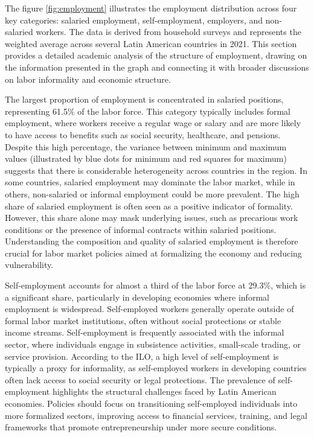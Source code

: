 \documentclass[english]{article}
\begin{document}
\begin{enumerate}
The figure \ref{fig:employment} illustrates the employment distribution across four key categories: salaried employment, self-employment, employers, and non-salaried workers. The data is derived from household surveys and represents the weighted average across several Latin American countries in 2021. This section provides a detailed academic analysis of the structure of employment, drawing on the information presented in the graph and connecting it with broader discussions on labor informality and economic structure.

The largest proportion of employment is concentrated in salaried positions, representing 61.5\% of the labor force. This category typically includes formal employment, where workers receive a regular wage or salary and are more likely to have access to benefits such as social security, healthcare, and pensions. Despite this high percentage, the variance between minimum and maximum values (illustrated by blue dots for minimum and red squares for maximum) suggests that there is considerable heterogeneity across countries in the region. In some countries, salaried employment may dominate the labor market, while in others, non-salaried or informal employment could be more prevalent. The high share of salaried employment is often seen as a positive indicator of formality. However, this share alone may mask underlying issues, such as precarious work conditions or the presence of informal contracts within salaried positions. Understanding the composition and quality of salaried employment is therefore crucial for labor market policies aimed at formalizing the economy and reducing vulnerability.

Self-employment accounts for almost a third of the labor force at 29.3\%, which is a significant share, particularly in developing economies where informal employment is widespread. Self-employed workers generally operate outside of formal labor market institutions, often without social protections or stable income streams.
Self-employment is frequently associated with the informal sector, where individuals engage in subsistence activities, small-scale trading, or service provision. According to the ILO, a high level of self-employment is typically a proxy for informality, as self-employed workers in developing countries often lack access to social security or legal protections. The prevalence of self-employment highlights the structural challenges faced by Latin American economies. Policies should focus on transitioning self-employed individuals into more formalized sectors, improving access to financial services, training, and legal frameworks that promote entrepreneurship under more secure conditions.


\end{enumerate}
\end{document}

